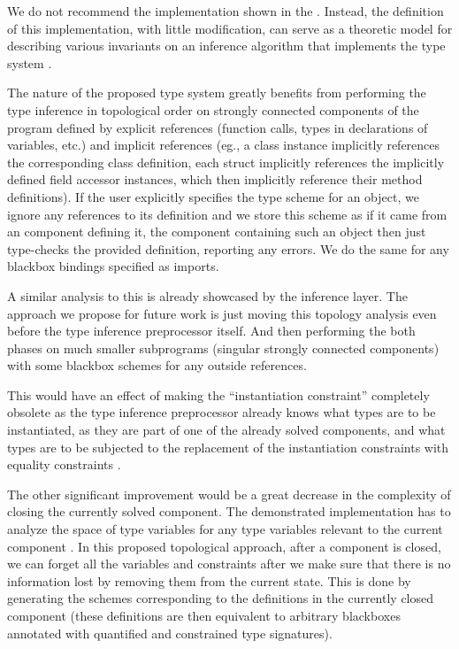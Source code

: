 We do not recommend the implementation shown in the . Instead, the definition of this implementation, with little modification, can serve as a theoretic model for describing various invariants on an inference algorithm that implements the type system .

The nature of the proposed type system greatly benefits from performing the type inference in topological order on strongly connected components of the program defined by explicit references (function calls, types in declarations of variables, etc.) and implicit references (eg., a class instance implicitly references the corresponding class definition, each struct implicitly references the implicitly defined field accessor instances, which then implicitly reference their method definitions). If the user explicitly specifies the type scheme for an object, we ignore any references to its definition and we store this scheme as if it came from an component defining it, the component containing such an object then just type-checks the provided definition, reporting any errors. We do the same for any blackbox bindings specified as imports.

A similar analysis to this is already showcased by the inference layer. The approach we propose for future work is just moving this topology analysis even before the type inference preprocessor itself. And then performing the both phases on much smaller subprograms (singular strongly connected components) with some blackbox schemes for any outside references. 

This would have an effect of making the ``instantiation constraint'' completely obsolete as the type inference preprocessor already knows what types are to be instantiated, as they are part of one of the already solved components, and what types are to be subjected to the replacement of the instantiation constraints with equality constraints .

The other significant improvement would be a great decrease in the complexity of closing the currently solved component. The demonstrated implementation has to analyze the space of type variables for any type variables relevant to the current component . In this proposed topological approach, after a component is closed, we can forget all the variables and constraints after we make sure that there is no information lost by removing them from the current state. This is done by generating the schemes  corresponding to the definitions in the currently closed component (these definitions are then equivalent to arbitrary blackboxes annotated with quantified and constrained type signatures).

